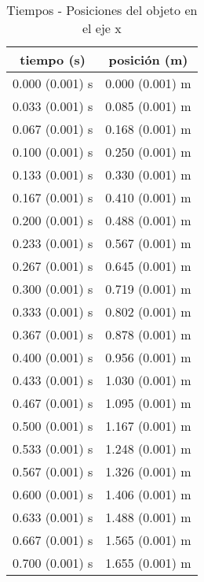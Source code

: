 \documentclass[12pt,a4paper]{article}
\begin{document}
\begin{table}[!h]
\begin{center}
\begin{tabular}{|c|c|}
\hline
tiempo (s) & posición (m) \\ \hline
0.000 (0.001) s & 0.000 (0.001) m \\ \hline
0.033 (0.001) s & 0.085 (0.001) m \\ \hline
0.067 (0.001) s & 0.168 (0.001) m \\ \hline
0.100 (0.001) s & 0.250 (0.001) m \\ \hline
0.133 (0.001) s & 0.330 (0.001) m \\ \hline
0.167 (0.001) s & 0.410 (0.001) m \\ \hline
0.200 (0.001) s & 0.488 (0.001) m \\ \hline
0.233 (0.001) s & 0.567 (0.001) m \\ \hline
0.267 (0.001) s & 0.645 (0.001) m \\ \hline
0.300 (0.001) s & 0.719 (0.001) m \\ \hline
0.333 (0.001) s & 0.802 (0.001) m \\ \hline
0.367 (0.001) s & 0.878 (0.001) m \\ \hline
0.400 (0.001) s & 0.956 (0.001) m \\ \hline
0.433 (0.001) s & 1.030 (0.001) m \\ \hline
0.467 (0.001) s & 1.095 (0.001) m \\ \hline
0.500 (0.001) s & 1.167 (0.001) m \\ \hline
0.533 (0.001) s & 1.248 (0.001) m \\ \hline
0.567 (0.001) s & 1.326 (0.001) m \\ \hline
0.600 (0.001) s & 1.406 (0.001) m \\ \hline
0.633 (0.001) s & 1.488 (0.001) m \\ \hline
0.667 (0.001) s & 1.565 (0.001) m \\ \hline
0.700 (0.001) s & 1.655 (0.001) m \\ \hline
\end{tabular}
\caption{Tiempos - Posiciones del objeto en el eje x}
\end{center}
\end{table}
\end{document}
